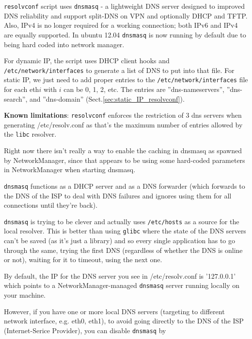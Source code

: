 \verb!resolvconf! script uses \verb!dnsmasq! - a lightweight DNS server designed
to improved DNS reliability and support split-DNS on VPN and optionally DHCP and
TFTP. Also, IPv4 is no longer required for a working connection; both IPv6 and
IPv4 are equally supported. In ubuntu 12.04 \verb!dnsmasq! is now running by
default due to being hard coded into network manager.

For dynamic IP, the script uses DHCP client hooks and
\verb!/etc/network/interfaces! to generate a list of DNS to put into that file.
For static IP, we just need to add proper entries to the
\verb!/etc/network/interfaces! file for each eth$i$ with $i$ can be 0, 1, 2,
etc. The entries are ''dns-nameservers'', ''dns-search'', and ''dns-domain''
(Sect.\ref{sec:static_IP_resolvconf}).

\begin{mdframed}
{\bf Known limitations}:
\verb!resolvconf! enforces the restriction of 3 dns servers when generating
/etc/resolv.conf as that's the maximum number of entries allowed by the
\verb!libc! resolver.

Right now there isn't really a way to enable the caching in dnsmasq as spawned
by NetworkManager, since that appears to be using some hard-coded parameters in
NetworkManager when starting dnsmasq.

\verb!dnsmasq! functions as a DHCP server and as a DNS
forwarder (which forwards to the DNS of the ISP to deal with DNS failures and
ignores using them for all connections until they're back).

\verb!dnsmasq! is trying to be clever and actually uses \verb!/etc/hosts! as a
source for the local resolver.
This is better than using \verb!glibc! where the state of the DNS servers can't
be saved (as it's just a library) and so every single application has to go
through the same, trying the first DNS (regardless of whether the DNS is online
or not), waiting for it to timeout, using the next one.

\end{mdframed}

By default, the IP for the DNS server you see in /etc/resolv.conf is '127.0.0.1'
which points to a NetworkManager-managed \verb!dnsmasq! server running locally
on your machine. 

However, if you have one or more local DNS servers (targeting to different
network interface, e.g. eth0, eth1), to avoid going directly to the DNS of the
ISP (Internet-Serice Provider), you can disable \verb!dnsmasq! by 

